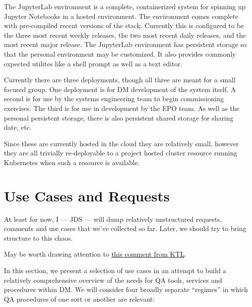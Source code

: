 \documentclass[DM,authoryear,toc,lsstdraft]{lsstdoc}
\begin{document}
The JupyterLab environment is a complete, containerized system for spinning up
Jupyter Notebooks in a hosted environment. The environment comes complete with
pre-compiled recent versions of the stack.  Currently this is configured to be
the three most recent weekly releases, the two most recent daily releases, and
the most recent major release. The JupyterLab environment has persistent storage
so that the personal environment may be customized.  It also provides commonly
expected utilites like a shell prompt as well as a text editor.

Currently there are three deployments, though all three are meant for a small
focused group. One deployment is for DM development of the system itself. A second
is for use by the systems engineering team to begin commissioning exercises. The
third is for use in development by the EPO team. As well as the personal persistent
storage, there is also persistent shared storage for sharing date, etc.

Since these are currently hosted in the cloud they are relatively small, however
they are all trivially re-deployable to a project hosted cluster resource running
Kubernetes when such a resource is available.

\section{Use Cases and Requests}
\label{sec:use}

\begin{draftnote}
At least for now, I --- JDS --- will dump relatively unstructured requests,
comments and use cases that we've collected so far. Later, we should try to
bring structure to this chaos.

May be worth drawing attention to
\href{https://github.com/lsst-dm/dmtn-074/commit/06fa883ebeb12cf728dda14fa82e4c1f01fa5696#r27754730}{this
comment from KTL}.
\end{draftnote}

In this section, we present a selection of use cases in an attempt to build a
relatively comprehensive overview of the needs for QA tools, services and
procedures within DM. We will consider four broadly separate ``regimes'' in
which QA procedures of one sort or another are relevant:
\end{document}
